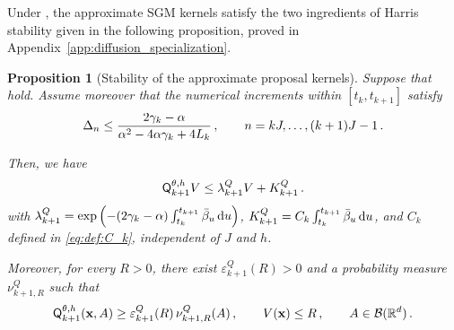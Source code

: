 \documentclass[11pt]{article}
\theoremstyle{plain}
\newtheorem{proposition}[theorem]{Proposition}
\theoremstyle{definition}
\theoremstyle{remark}
\begin{document}
Under ,
the approximate SGM kernels satisfy the two ingredients of Harris stability given in the following proposition, proved in Appendix~\ref{app:diffusion_specialization}.


\begin{proposition}[Stability of the approximate proposal kernels]
\label{prop:drift_minorization_proposal_theta}
Suppose that  hold. Assume moreover that the numerical increments within
$[t_k,t_{k+1}]$ satisfy
\begin{equation}
\label{eq:block_stepsize_condition}
\Delta_n \le \frac{2\gamma_k-\alpha}{\alpha^2-4\alpha\gamma_k+4L_k} \,,
\qquad n=kJ,\ldots,(k+1)J-1 \,.
\end{equation}

Then,
we have
\begin{equation}
\label{eq:block_proposal_drift}
    \mk{k+1}[\theta,h]V \le \lambda_{k+1}^Q V+K_{k+1}^Q\eqsp.
\end{equation}
with $\lambda_{k+1}^Q = \exp\left( -(2\gamma_k-\alpha) \int_{t_k}^{t_{k+1}}\bar{\beta}_{u}\,\mathrm{d} u \right)$, $K_{k+1}^Q = C_k \int_{t_k}^{t_{k+1}} \bar{\beta}_{u}\,\mathrm{d} u$, and $C_k$ defined in \eqref{eq:def:C_k}, independent of $J$ and $h$.

Moreover, for every $R>0$, there exist $\varepsilon_{k+1}^Q(R)>0$ and a probability measure $\nu_{k+1,R}^Q$ such that
\begin{equation}
\label{eq:block_proposal_minorization}
\mk{k+1}[\theta,h](\x,A) \ge \varepsilon_{k+1}^Q(R)\, \nu_{k+1,R}^Q(A) \eqsp, \qquad V(\x)\le R \eqsp, \qquad A \in \borelians{\rset^\xdim} \eqsp.
\end{equation}
\end{proposition}
\end{document}
